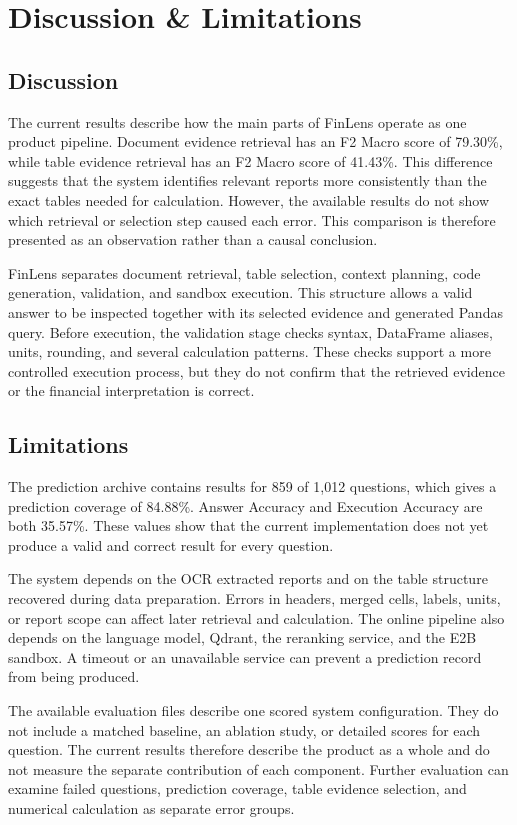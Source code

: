 \documentclass[10pt,journal,compsoc]{IEEEtran}
\begin{document}
\section{Discussion \& Limitations}

\subsection{Discussion}
The current results describe how the main parts of FinLens operate as one product pipeline. Document evidence retrieval has an F2 Macro score of 79.30\%, while table evidence retrieval has an F2 Macro score of 41.43\%. This difference suggests that the system identifies relevant reports more consistently than the exact tables needed for calculation. However, the available results do not show which retrieval or selection step caused each error. This comparison is therefore presented as an observation rather than a causal conclusion.

FinLens separates document retrieval, table selection, context planning, code generation, validation, and sandbox execution. This structure allows a valid answer to be inspected together with its selected evidence and generated Pandas query. Before execution, the validation stage checks syntax, DataFrame aliases, units, rounding, and several calculation patterns. These checks support a more controlled execution process, but they do not confirm that the retrieved evidence or the financial interpretation is correct.

\subsection{Limitations}
The prediction archive contains results for 859 of 1,012 questions, which gives a prediction coverage of 84.88\%. Answer Accuracy and Execution Accuracy are both 35.57\%. These values show that the current implementation does not yet produce a valid and correct result for every question.

The system depends on the OCR extracted reports and on the table structure recovered during data preparation. Errors in headers, merged cells, labels, units, or report scope can affect later retrieval and calculation. The online pipeline also depends on the language model, Qdrant, the reranking service, and the E2B sandbox. A timeout or an unavailable service can prevent a prediction record from being produced.

The available evaluation files describe one scored system configuration. They do not include a matched baseline, an ablation study, or detailed scores for each question. The current results therefore describe the product as a whole and do not measure the separate contribution of each component. Further evaluation can examine failed questions, prediction coverage, table evidence selection, and numerical calculation as separate error groups.
\end{document}
